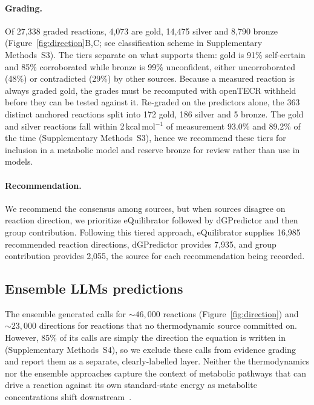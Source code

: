 \paragraph{Grading.} Of 27,338 graded reactions, 4,073 are gold, 14,475 silver and 8,790 bronze (Figure~\ref{fig:direction}B,C; see classification scheme in Supplementary Methods~S3).
The tiers separate on what supports them: gold is 91\% self-certain and 85\% corroborated while bronze is 99\% unconfident, either uncorroborated (48\%) or contradicted (29\%) by other sources.
Because a measured reaction is always graded gold, the grades must be recomputed with openTECR withheld before they can be tested against it.
Re-graded on the predictors alone, the 363 distinct anchored reactions split into 172 gold, 186 silver and 5 bronze.
The gold and silver reactions fall within 2\,kcal\,mol$^{-1}$ of measurement 93.0\% and 89.2\% of the time (Supplementary Methods~S3), hence we recommend these tiers for inclusion in a metabolic model and reserve bronze for review rather than use in models.

\paragraph{Recommendation.} We recommend the consensus among sources, but when sources disagree on reaction direction, we prioritize eQuilibrator followed by dGPredictor and then group contribution.
Following this tiered approach, eQuilibrator supplies 16,985 recommended reaction directions, dGPredictor provides 7,935, and group contribution provides 2,055, the source for each recommendation being recorded.

\subsection{Ensemble LLMs predictions}\label{sec:llm-grading-rslts}
The ensemble generated calls for $\sim46,000$ reactions (Figure~\ref{fig:direction}) and $\sim23,000$ directions for reactions that no thermodynamic source committed on.
However, 85\% of its calls are simply the direction the equation is written in (Supplementary Methods~S4), so we exclude these calls from evidence grading and report them as a separate, clearly-labelled layer.
Neither the thermodynamics nor the ensemble approaches capture the context of metabolic pathways that can drive a reaction against its own standard-state energy as metabolite concentrations shift downstream~\cite{noor2014}.